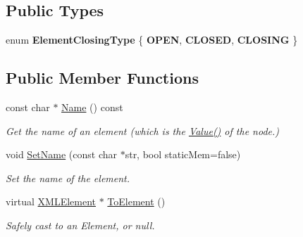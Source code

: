 \subsection*{Public Types}
\begin{DoxyCompactItemize}
\item 
\mbox{\label{classtinyxml2_1_1_x_m_l_element_ab5f90e2493c35702175235127e2935b4}} 
enum {\bfseries Element\+Closing\+Type} \{ {\bfseries O\+P\+EN}, 
{\bfseries C\+L\+O\+S\+ED}, 
{\bfseries C\+L\+O\+S\+I\+NG}
 \}
\end{DoxyCompactItemize}
\subsection*{Public Member Functions}
\begin{DoxyCompactItemize}
\item 
\mbox{\label{classtinyxml2_1_1_x_m_l_element_a63e057fb5baee1dd29f323cb85907b35}} 
const char $\ast$ \hyperlink{classtinyxml2_1_1_x_m_l_element_a63e057fb5baee1dd29f323cb85907b35}{Name} () const
\begin{DoxyCompactList}\small\item\em Get the name of an element (which is the \hyperlink{classtinyxml2_1_1_x_m_l_node_a0485e51c670e741884cfd8362274d680}{Value()} of the node.) \end{DoxyCompactList}\item 
\mbox{\label{classtinyxml2_1_1_x_m_l_element_a97712009a530d8cb8a63bf705f02b4f1}} 
void \hyperlink{classtinyxml2_1_1_x_m_l_element_a97712009a530d8cb8a63bf705f02b4f1}{Set\+Name} (const char $\ast$str, bool static\+Mem=false)
\begin{DoxyCompactList}\small\item\em Set the name of the element. \end{DoxyCompactList}\item 
\mbox{\label{classtinyxml2_1_1_x_m_l_element_ad9ff5c2dbc15df36cf664ce1b0ea0a5d}} 
virtual \hyperlink{classtinyxml2_1_1_x_m_l_element}{X\+M\+L\+Element} $\ast$ \hyperlink{classtinyxml2_1_1_x_m_l_element_ad9ff5c2dbc15df36cf664ce1b0ea0a5d}{To\+Element} ()
\begin{DoxyCompactList}\small\item\em Safely cast to an Element, or null. \end{DoxyCompactList}\item 

\end{DoxyCompactItemize}
